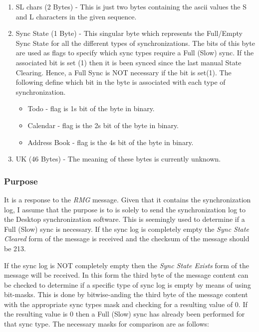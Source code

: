             \begin{enumerate}
            \item SL chars (2 Bytes) - This is just two bytes containing
            the ascii values the S and L characters in the given sequence.

            \item Sync State (1 Byte) - This singular byte which
            represents the Full/Empty Sync State for all the different
            types of synchronizations. The bits of this byte are used as
            flags to specify which sync types require a Full (Slow)
            sync. If the associated bit is set (1) then it is been
            synced since the last manual State Clearing. Hence, a Full
            Sync is NOT necessary if the bit is set(1). The following
            define which bit in the byte is associated with each type of
            synchronization.
                \begin{itemize}
                \item Todo - flag is 1s bit of the byte in binary.
                \item Calendar - flag is the 2s bit of the byte in
                binary.
                \item Address Book - flag is the 4s bit of the byte in
                binary.
                \end{itemize}

            \item UK (46 Bytes) - The meaning of these bytes is
            currently unknown.
            \end{enumerate}

            \subsubsection{Purpose}

            It is a response to the \emph{RMG} message. Given that it
            contains the synchronization log, I assume that the purpose
            is to is solely to send the synchronization log to the
            Desktop synchronization software. This is seemingly used to
            determine if a Full (Slow) sync is necessary. If the sync
            log is completely empty the \emph{Sync State Cleared} form
            of the message is received and the checksum of the message
            should be 213.
            
            If the sync log is NOT completely empty then the \emph{Sync
            State Exists} form of the message will be received.  In this
            form the third byte of the message content can be checked to
            determine if a specific type of sync log is empty by means
            of using bit-masks. This is done by bitwise-anding the third
            byte of the message content with the appropriate sync types
            mask and checking for a resulting value of 0. If the
            resulting value is 0 then a Full (Slow) sync has already
            been performed for that sync type. The necessary masks for
            comparison are as follows:

